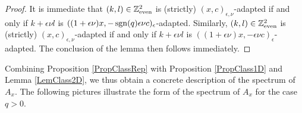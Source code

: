 \begin{proof} It is immediate that $(k,l)\in \mathbb{Z}^2_{\mathrm{even}}$ is (strictly) $(x,c)_{\epsilon,\nu}$-adapted if and only if $k+\epsilon\nu l$ is $((1+\epsilon\nu)x,-\operatorname{\mathrm{sgn}}(q)\epsilon\nu c)_{\epsilon}$-adapted. Similarly, $(k,l)\in \mathbb{Z}^2_{\mathrm{even}}$ is (strictly) $(x,c)_{\epsilon,\nu}$-adapted if and only if $k+\epsilon\nu l$ is $((1+\epsilon\nu)x,-\epsilon\nu c)_{\epsilon}$-adapted. The conclusion of the lemma then follows immediately.
\end{proof}

Combining Proposition \ref{PropClassRep} with Proposition \ref{PropClass1D} and Lemma \ref{LemClass2D}, we thus obtain a concrete description of the spectrum of $A_x$. The following pictures illustrate the form of the spectrum of $A_x$ for the case $q>0$.




















